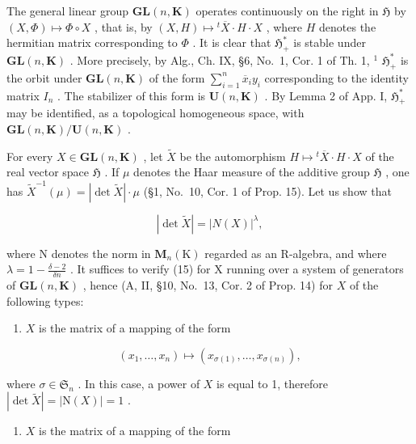 The general linear group \(\mathbf{GL}(n,\mathbf{K})\) operates continuously on the right in \(\mathfrak{H}\) by \((X,\Phi)\mapsto\Phi\circ X\) , that is, by \((X,H)\mapsto{}^{t}\overline{X}\cdot H\cdot X\) , where \(H\) denotes the hermitian matrix corresponding to \(\Phi\) . It is clear that \(\mathfrak{H}_{+}^{*}\) is stable under \(\mathbf{GL}(n,\mathbf{K})\) . More precisely, by Alg., Ch. IX, §6, No.~1, Cor. 1 of Th. 1, \(^{1}\) \(\mathfrak{H}_{+}^{*}\) is the orbit under \(\mathbf{GL}(n,\mathbf{K})\) of the form \(\sum_{i=1}^{n}\overline{x}_{i}y_{i}\) corresponding to the identity matrix \(I_{n}\) . The stabilizer of this form is \(\mathbf{U}(n,\mathbf{K})\) . By Lemma 2 of App. I, \(\mathfrak{H}_{+}^{*}\) may be identified, as a topological homogeneous space, with \(\mathbf{GL}(n,\mathbf{K})/\mathbf{U}(n,\mathbf{K})\) .

For every \(X \in \mathbf{GL}(n, \mathbf{K})\) , let \(\widetilde{X}\) be the automorphism \(H \mapsto {}^t \overline{X} \cdot H \cdot X\) of the real vector space \(\mathfrak{H}\) . If \(\mu\) denotes the Haar measure of the additive group \(\mathfrak{H}\) , one has \(\widetilde{X}^{-1}(\mu) = |\det \widetilde{X}| \cdot \mu\) (§1, No.~10, Cor. 1 of Prop. 15). Let us show that

\[
| \det \widetilde {X} | = | N (X) | ^ {\lambda},\tag{15}
\]

where N denotes the norm in \(\mathbf{M}_{n}(\mathrm{K})\) regarded as an R-algebra, and where \(\lambda = 1 - \frac{\delta - 2}{\delta n}\) . It suffices to verify (15) for X running over a system of generators of \(\mathbf{GL}(n,\mathbf{K})\) , hence (A, II, §10, No.~13, Cor. 2 of Prop. 14) for \(X\) of the following types:

\begin{enumerate}
\def\labelenumi{\alph{enumi})}
\tightlist
\item
  \(X\) is the matrix of a mapping of the form
\end{enumerate}

\[
\left(x _ {1}, \dots , x _ {n}\right) \mapsto \left(x _ {\sigma (1)}, \dots , x _ {\sigma (n)}\right),
\]

where \(\sigma \in \mathfrak{S}_n\) . In this case, a power of \(X\) is equal to 1, therefore \(|\det \widetilde{X}| = |\mathrm{N}(X)| = 1\) .

\begin{enumerate}
\def\labelenumi{\alph{enumi})}
\setcounter{enumi}{1}
\tightlist
\item
  \(X\) is the matrix of a mapping of the form
\end{enumerate}

